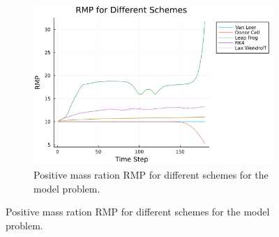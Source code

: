 \begin{figure}[h]
\begin{subfigure}[b]{0.3\textwidth}
        \includegraphics[width=\textwidth]{./images/rectangle-RMP.png}
        \caption{Positive mass ration $\mathrm{RMP}$ for different schemes for the model problem.}
        \label{fig:rm}
    \end{subfigure}

    \vspace{0.5cm} %


\end{figure}
